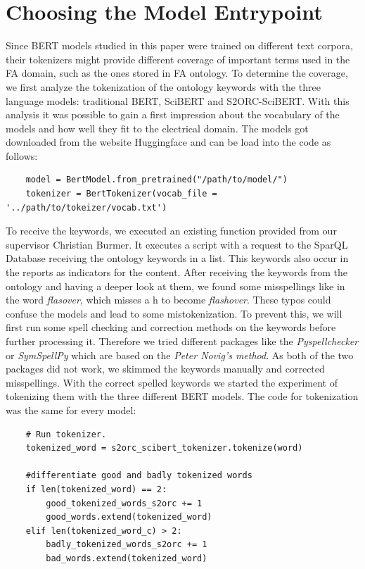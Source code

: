 \section{Choosing the Model Entrypoint}
Since BERT models studied in this paper were trained on different text corpora, their tokenizers might provide different coverage of important terms used in the FA domain, such as the ones stored in FA ontology. To determine the coverage, we first analyze the tokenization of the ontology keywords with the three language models: traditional BERT, SciBERT and S2ORC-SciBERT. With this analysis it was possible to gain a first impression about the vocabulary of the models and how well they fit to the electrical domain. \newline
The models got downloaded from the website \alert{Huggingface} and can be load into the code as follows:
\begin{verbatim}
	model = BertModel.from_pretrained("/path/to/model/")
	tokenizer = BertTokenizer(vocab_file = '../path/to/tokeizer/vocab.txt')
\end{verbatim}

To receive the keywords, we executed an existing function provided from our supervisor Christian Burmer. It executes a script with a request to the SparQL Database receiving the ontology keywords in a list. This keywords also occur in the reports as indicators for the content. \newline
After receiving the keywords from the ontology and having a deeper look at them, we found some misspellings like in the word \textit{flasover}, which misses a h to become \textit{flashover}. These typos could confuse the models and lead to some mistokenization. To prevent this, we will first run some spell checking and correction methods on the keywords before further processing it. Therefore we tried different packages like the \textit{Pyspellchecker} or \textit{SymSpellPy} which are based on the \textit\alert{{Peter Novig's method}}. As both of the two packages did not work, we skimmed the keywords manually and corrected misspellings. \newline
With the correct spelled keywords we started the experiment of tokenizing them with the three different BERT models. The code for tokenization was the same for every model:
\begin{verbatim}
	# Run tokenizer.
	tokenized_word = s2orc_scibert_tokenizer.tokenize(word)
	
	#differentiate good and badly tokenized words
	if len(tokenized_word) == 2:
		good_tokenized_words_s2orc += 1
		good_words.extend(tokenized_word) 
	elif len(tokenized_word_c) > 2:
		badly_tokenized_words_s2orc += 1
		bad_words.extend(tokenized_word)
\end{verbatim}

